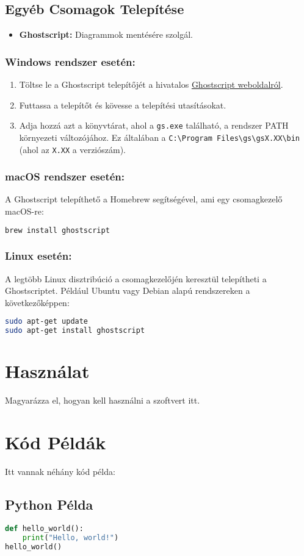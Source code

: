 \documentclass{article}
\begin{document}
\subsection{Egyéb Csomagok Telepítése}
\begin{itemize}
    \item \textbf{Ghostscript:} Diagrammok mentésére szolgál.
\end{itemize}
\subsubsection*{Windows rendszer esetén:}
\begin{enumerate}
    \item Töltse le a Ghostscript telepítőjét a hivatalos \href{https://www.ghostscript.com/download/gsdnld.html}{Ghostscript weboldalról}.
    \item Futtassa a telepítőt és kövesse a telepítési utasításokat.
    \item Adja hozzá azt a könyvtárat, ahol a \texttt{gs.exe} található, a rendszer PATH környezeti változójához. Ez általában a \texttt{C:\textbackslash Program Files\textbackslash gs\textbackslash gsX.XX\textbackslash bin} (ahol az \texttt{X.XX} a verziószám).
\end{enumerate}

\subsubsection*{macOS rendszer esetén:}
A Ghostscript telepíthető a Homebrew segítségével, ami egy csomagkezelő macOS-re:
\begin{lstlisting}[language=sh]
brew install ghostscript
\end{lstlisting}

\subsubsection*{Linux esetén:}
A legtöbb Linux disztribúció a csomagkezelőjén keresztül telepítheti a Ghostscriptet. Például Ubuntu vagy Debian alapú rendszereken a következőképpen:
\begin{lstlisting}[language=sh]
sudo apt-get update
sudo apt-get install ghostscript
\end{lstlisting}

\section{Használat}
Magyarázza el, hogyan kell használni a szoftvert itt.

\section{Kód Példák}
Itt vannak néhány kód példa:

\subsection{Python Példa}
\begin{lstlisting}[language=Python, caption=Python Példa]
def hello_world():
    print("Hello, world!")
hello_world()
\end{lstlisting}
\end{document}

